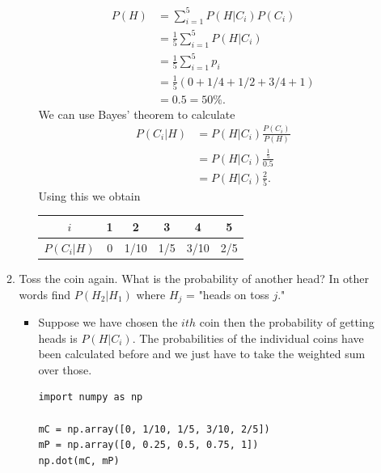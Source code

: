 \documentclass{article}
\begin{document}
\begin{enumerate}
\begin{enumerate}
\begin{itemize}
				$$
				\begin{aligned}
				P(H) &= \sum_{i = 1}^5 P(H|C_i)P(C_i) \\
				&= \frac{1}{5} \sum_{i = 1}^5 P(H|C_i) \\
				&= \frac{1}{5} \sum_{i = 1}^5 p_i \\
				&= \frac{1}{5} (0 + 1/4 + 1/2 + 3/4 + 1) \\
				&= 0.5 = 50\%.
				\end{aligned}
				$$
				We can use Bayes' theorem to calculate
				$$
				\begin{aligned}
				P(C_i|H) &= P(H|C_i) \frac{P(C_i)}{P(H)} \\
				&= P(H|C_i) \frac{\frac{1}{5}}{0.5} \\
				&= P(H|C_i) \frac{2}{5}.
				\end{aligned}
				$$
				Using  this we obtain
				\begin{center}
				\begin{tabular}{|c|c|c|c|c|c|}
				\hline
				$i$ & 1 & 2 & 3 & 4 & 5 \\ 
				\hline
				$P(C_i|H)$ & 0 & 1/10 & 1/5 & 3/10 & 2/5 \\
				\hline
				\end{tabular}
				\end{center}
			\end{itemize}
		\item Toss the coin again. What is the probability of another head? In other words find $P(H_2|H_1)$ where $H_j$ = "heads on toss $j$."
			\begin{itemize}
				\item Suppose we have chosen the $ith$ coin then the probability of getting heads is $P(H|C_i)$. The probabilities of the individual coins have been calculated before and we just have to take the weighted sum over those.
\begin{verbatim}
import numpy as np

mC = np.array([0, 1/10, 1/5, 3/10, 2/5])
mP = np.array([0, 0.25, 0.5, 0.75, 1])
np.dot(mC, mP)


\end{verbatim}
\end{itemize}
\end{enumerate}
\end{enumerate}
\end{document}
